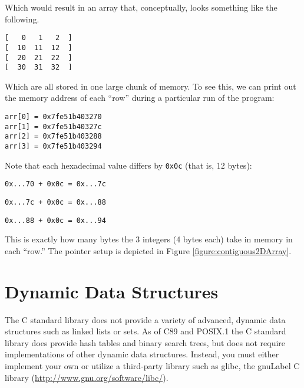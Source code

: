 Which would result in an array that, conceptually, looks something like
the following.

\begin{verbatim}
[   0   1   2  ]
[  10  11  12  ]
[  20  21  22  ]
[  30  31  32  ]
\end{verbatim}

Which are all stored in one large chunk of memory.  To see this, 
we can print out the memory address of each ``row'' during a
particular run of the program:

\begin{verbatim}
arr[0] = 0x7fe51b403270
arr[1] = 0x7fe51b40327c
arr[2] = 0x7fe51b403288
arr[3] = 0x7fe51b403294
\end{verbatim}

Note that each hexadecimal value differs by \texttt{0x0c}
(that is, 12 bytes): 

\texttt{0x...70 + 0x0c = 0x...7c} 

\texttt{0x...7c + 0x0c = 0x...88}

\texttt{0x...88 + 0x0c = 0x...94}

This is exactly how many bytes the 3 integers (4 bytes each) 
take in memory in each ``row.''  The pointer setup is depicted in
Figure \ref{figure:contiguous2DArray}.



\section{Dynamic Data Structures}

The C standard library does not provide a variety of advanced, dynamic
data structures such as linked lists or sets.  As of C89 and POSIX.1 the
C standard library does provide hash tables and binary search trees, but
does not require implementations of other dynamic data structures.
Instead, you must either implement your own or utilize a third-party 
library such as glibc, the \gls{gnuLabel} C library 
(\url{http://www.gnu.org/software/libc/}).





